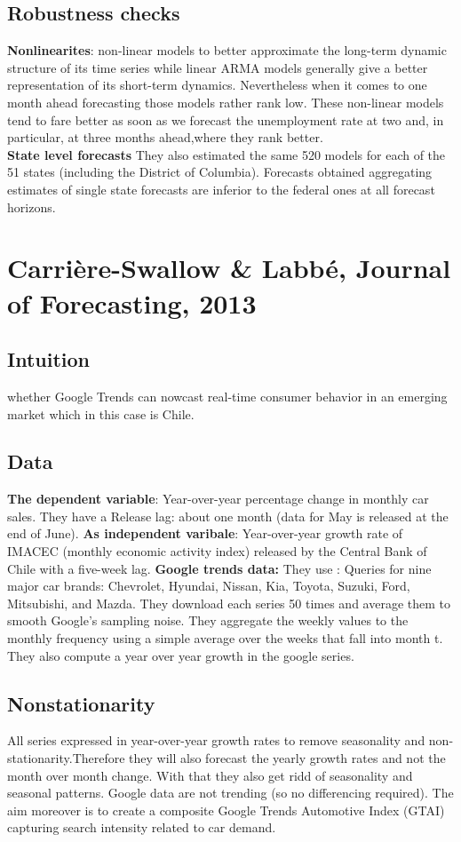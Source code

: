 \documentclass{article}
\begin{document}
\subsection{Robustness checks}
\textbf{Nonlinearites}: non-linear models to better approximate the long-term dynamic structure of its time
series while linear
ARMA models generally give a better representation of its short-term dynamics. Nevertheless when it comes to one month ahead forecasting those models rather rank low.  These non-linear models tend to fare better as soon as we forecast
the unemployment rate at two and, in particular, at three months ahead,where they rank better.
\\
\textbf{State level forecasts}
They also estimated the
same 520 models for each of the 51 states (including the District of Columbia). Forecasts obtained aggregating estimates of single state forecasts are inferior to the
federal ones at all forecast horizons.
\newpage

\section{Carrière-Swallow \& Labbé, Journal of Forecasting, 2013}
\subsection{Intuition}
whether Google Trends can nowcast real-time consumer behavior in an emerging market which in this case is Chile. 

\subsection{Data}
\textbf{The dependent variable}: Year-over-year percentage change in monthly car sales. They have a Release lag: about one month (data for May is released at the end of June). 
\textbf{As independent varibale}: Year-over-year growth rate of IMACEC (monthly economic activity index) released by the Central Bank of Chile with a five-week lag.
\textbf{Google trends data:} They use : Queries for nine major car brands: Chevrolet, Hyundai, Nissan, Kia, Toyota, Suzuki, Ford, Mitsubishi, and Mazda. They download each series 50 times and average them to smooth Google’s sampling noise.
They aggregate the weekly values to the monthly frequency using a simple average over the weeks that fall into month t. 
They also compute a year over year growth in the google series.



\subsection{Nonstationarity}
All series expressed in year-over-year growth rates to remove seasonality and non-stationarity.Therefore they will also forecast the yearly growth rates and not the month over month change. With that they also get ridd of seasonality and seasonal patterns.  Google data are not trending (so no differencing required). The aim moreover is to create a composite Google Trends Automotive Index (GTAI) capturing search intensity related to car demand.
\end{document}
